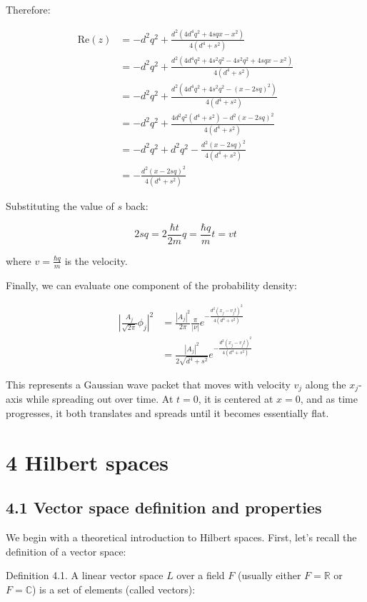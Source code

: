 \documentclass[10pt]{article}
\begin{document}
Therefore:

\begin{align*}
\text{Re}(z) &= -d^2q^2+\frac{d^2(4d^4q^2+4sqx-x^2)}{4(d^4+s^2)} \\
&= -d^2q^2+\frac{d^2(4d^4q^2+4s^2q^2-4s^2q^2+4sqx-x^2)}{4(d^4+s^2)} \\
&= -d^2q^2+\frac{d^2(4d^4q^2+4s^2q^2-(x-2sq)^2)}{4(d^4+s^2)} \\
&= -d^2q^2+\frac{4d^2q^2(d^4+s^2)-d^2(x-2sq)^2}{4(d^4+s^2)} \tag{3.21} \\
&= -d^2q^2+d^2q^2-\frac{d^2(x-2sq)^2}{4(d^4+s^2)} \\
&= -\frac{d^2(x-2sq)^2}{4(d^4+s^2)}
\end{align*}

Substituting the value of $s$ back:

\begin{equation*}
2sq = 2\frac{\hbar t}{2m}q = \frac{\hbar q}{m}t = vt \tag{3.22}
\end{equation*}

where $v = \frac{\hbar q}{m}$ is the velocity.

Finally, we can evaluate one component of the probability density:

\begin{align*}
\left|\frac{A_j}{\sqrt{2\pi}}\phi_j\right|^2 &= \frac{|A_j|^2}{2\pi}\frac{\pi}{|\nu|}e^{-\frac{d^2(x_j-v_jt)^2}{4(d^4+s^2)}} \\
&= \frac{|A_j|^2}{2\sqrt{d^4+s^2}}e^{-\frac{d^2(x_j-v_jt)^2}{4(d^4+s^2)}} \tag{3.23}
\end{align*}

This represents a Gaussian wave packet that moves with velocity $v_j$ along the $x_j$-axis while spreading out over time. At $t=0$, it is centered at $x=0$, and as time progresses, it both translates and spreads until it becomes essentially flat.

\section*{4 Hilbert spaces}
\subsection*{4.1 Vector space definition and properties}

We begin with a theoretical introduction to Hilbert spaces. First, let's recall the definition of a vector space:

Definition 4.1. A linear vector space $L$ over a field $F$ (usually either $F=\mathbb{R}$ or $F=\mathbb{C}$) is a set of elements (called vectors):
\end{document}
